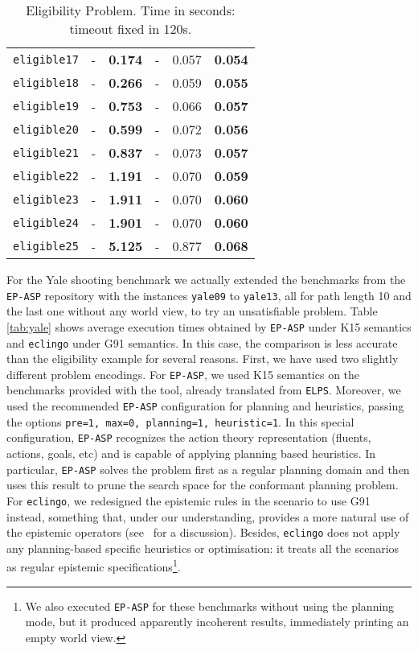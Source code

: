 \documentclass{new_tlp}
\def\eclingo{{\tt eclingo}}
\def\EPASP{{\tt EP-ASP}}
\begin{document}
\begin{table}[ht]
\begin{tabular}{c|cc|ccc}
\texttt{eligible17} & -       & \textbf{0.174}   & -                 & 0.057    & \textbf{0.054}  \\
\texttt{eligible18} & -       & \textbf{0.266}   & -                 & 0.059    & \textbf{0.055}  \\
\texttt{eligible19} & -       & \textbf{0.753}   & -                 & 0.066    & \textbf{0.057}  \\
\texttt{eligible20} & -       & \textbf{0.599}   & -                 & 0.072    & \textbf{0.056}  \\
\texttt{eligible21} & -       & \textbf{0.837}   & -                 & 0.073    & \textbf{0.057}  \\
\texttt{eligible22} & -       & \textbf{1.191}   & -                 & 0.070    & \textbf{0.059}  \\
\texttt{eligible23} & -       & \textbf{1.911}   & -                 & 0.070    & \textbf{0.060}  \\
\texttt{eligible24} & -       & \textbf{1.901}   & -                 & 0.070    & \textbf{0.060}  \\
\texttt{eligible25} & -       & \textbf{5.125}   & -                 & 0.877    & \textbf{0.068}  \\ \cline{1-6}
\end{tabular}
\caption{Eligibility Problem. Time in seconds: timeout fixed in 120s.}
\label{tab:eligible}
\end{table}

For the Yale shooting benchmark we actually extended the benchmarks from the \EPASP{} repository with the instances {\tt yale09} to {\tt yale13}, all for path length 10 and the last one without any world view, to try an unsatisfiable problem.
%
Table \ref{tab:yale} shows average execution times obtained by \EPASP{} under K15 semantics and \eclingo{} under G91 semantics. 
%
In this case, the comparison is less accurate than the eligibility example for several reasons. 
%
First, we have used two slightly different problem encodings. 
%
For \EPASP{}, we used K15 semantics on the benchmarks provided with the tool, already translated from {\tt ELPS}. Moreover, we used the recommended \EPASP{} configuration for planning and heuristics, passing the options {\tt pre=1, max=0, planning=1, heuristic=1}.
%
In this special configuration, \EPASP{} recognizes the action theory representation (fluents, actions, goals, etc) and is capable of applying planning based heuristics. In particular, \EPASP{} solves the problem first as a regular planning domain and then uses this result to prune the search space for the conformant planning problem. For \eclingo{}, we redesigned the epistemic rules in the scenario to use G91 instead, something that, under our understanding, provides a more natural use of the epistemic operators (see~ for a discussion). Besides, \eclingo{} does not apply any planning-based specific heuristics or optimisation: it treats all the scenarios as regular epistemic specifications\footnote{We also executed \EPASP{} for these benchmarks without using the planning mode, but it produced apparently incoherent results, immediately printing an empty world view.}.
\end{document}
